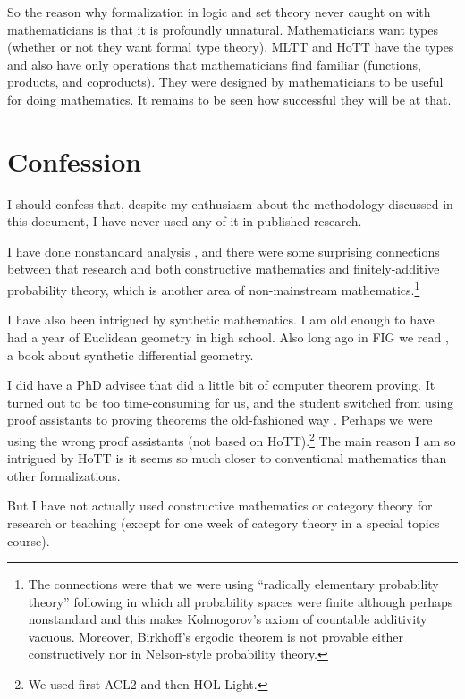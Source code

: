 \documentclass[11pt]{article}
\begin{document}
So the reason why formalization in logic and set theory never caught on
with mathematicians is that it is profoundly unnatural.  Mathematicians
want types (whether or not they want formal type theory).  MLTT and HoTT
have the types and also have only operations that mathematicians find familiar
(functions, products, and coproducts).
They were designed by mathematicians to be
useful for doing mathematics.  It remains to be seen how successful they
will be at that.

\section{Confession}

I should confess that, despite my enthusiasm about the methodology discussed
in this document, I have never used any of it in published research.

I have done nonstandard analysis
\citep{geyer-nsa,de-andrade-geyer,geyer-de-andrade},
and there were some surprising connections between that research and
both constructive mathematics \citep{bishop} and finitely-additive
probability theory,
which is another area of non-mainstream mathematics.\footnote{The
connections were that we were using ``radically elementary probability theory''
following \citet{nelson}
in which all probability spaces were finite although perhaps nonstandard
and this makes Kolmogorov's axiom of countable additivity vacuous.
Moreover, Birkhoff's ergodic theorem is not provable either constructively
\citep{bishop} nor in Nelson-style probability theory.}

I have also been intrigued by synthetic mathematics.  I am old enough to
have had a year of Euclidean geometry in high school.  Also long
ago in FIG we read \citet{bell}, a book about synthetic differential geometry.

I did have a PhD advisee that did a little bit of computer theorem proving.
It turned out to be too time-consuming for us, and the student switched
from using proof assistants \citep[Chapter~6]{johnson-thesis} to proving
theorems the old-fashioned
way \citep[the rest of the thesis and][]{johnson-geyer}.
Perhaps we were using the wrong proof assistants
(not based on HoTT).\footnote{We used first ACL2 and then HOL Light.}
The main reason I am so intrigued by HoTT is it seems so much closer
to conventional mathematics than other formalizations.

But I have not actually used constructive mathematics or category theory
for research or teaching (except for one week of category theory in
a special topics course).
\end{document}
